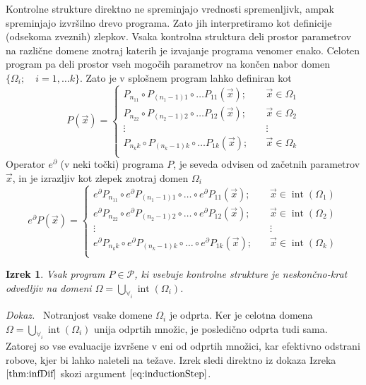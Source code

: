 \documentclass[a4paper, 12pt]{book}
\newcommand{\dP}{\mathcal{P}}
\newcommand{\D}{\partial}
\DeclareMathOperator{\interior}{int}
\newtheorem{izrek}{Izrek}[chapter]
\newenvironment{dokaz}{\emph{Dokaz.}\ }{\hspace{\fill}{$\Box$}}
\begin{document}
Kontrolne strukture direktno ne spreminjajo vrednosti spremenljivk, ampak spreminjajo izvršilno drevo programa. Zato jih interpretiramo kot definicije (odsekoma zveznih) zlepkov. Vsaka kontrolna struktura deli prostor parametrov na različne domene znotraj katerih je izvajanje programa venomer enako. Celoten program pa deli prostor vseh mogočih parametrov na končen nabor domen $\{\Omega_i;\quad i=1,\ldots
  k\}$. Zato je v splošnem program lahko definiran kot
\begin{equation}
   \label{eq:zlrprk_splosno}
   P(\vec{x}) =
   \begin{cases}
     P_{n_11}\circ P_{(n_1-1)1}\circ\ldots P_{11}(\vec{x});&\quad \vec{x}\in\Omega_1\\
     P_{n_22}\circ P_{(n_2-1)2}\circ\ldots P_{12}(\vec{x});&\quad \vec{x}\in\Omega_2\\
     \vdots&\quad\vdots\\
     P_{n_kk}\circ P_{(n_k-1)k}\circ\ldots P_{1k}(\vec{x});&\quad \vec{x}\in\Omega_k\\
   \end{cases}
 \end{equation}
 Operator $e^\D$ (v neki točki) programa $P$, je seveda odvisen od začetnih parametrov $\vec{x}$, in je izrazljiv kot zlepek znotraj domen $\Omega_i$
 \begin{equation}
   \label{eq:Dzlrprk_splosno}
   e^\D P({\vec{x}}) =
   \begin{cases}
     e^\D P_{n_11}\circ e^\D P_{(n_1-1)1}\circ\ldots\circ e^\D P_{11}(\vec{x});&\quad \vec{x}\in\interior(\Omega_1)\\
     e^\D P_{n_22}\circ e^\D P_{(n_2-1)2}\circ\ldots\circ e^\D P_{12}(\vec{x});&\quad \vec{x}\in\interior(\Omega_2)\\
     \vdots&\quad\vdots\\
     e^\D P_{n_kk}\circ e^\D P_{(n_k-1)k}\circ\ldots\circ e^\D P_{1k}(\vec{x});&\quad \vec{x}\in\interior(\Omega_k)\\
   \end{cases}
 \end{equation}

 \begin{izrek}\label{izr:diferentiableOnDomain}
 Vsak program $P\in\dP$, ki vsebuje kontrolne strukture je neskončno-krat odvedljiv na domeni $\Omega=\bigcup\limits_{\forall_i}\interior(\Omega_i)$.
 \end{izrek}
 \begin{dokaz}
  Notranjost vsake domene $\Omega_i$ je odprta. Ker je celotna domena $\Omega=\bigcup\limits_{\forall_i}\interior(\Omega_i)$ unija odprtih množic, je posledično odprta tudi sama. Zatorej so vse evaluacije izvršene v eni od odprtih množici, kar efektivno odstrani robove, kjer bi lahko naleteli na težave. Izrek sledi direktno iz dokaza Izreka $\ref{thm:infDif}$ skozi argument $\eqref{eq:inductionStep}$.
 \end{dokaz}
 
\end{document}
